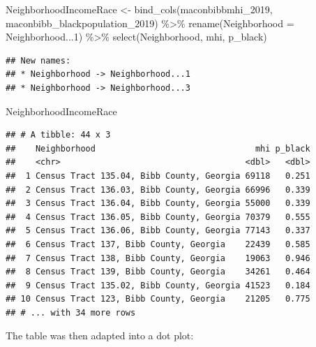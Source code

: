 \documentclass[
]{article}
\newenvironment{Shaded}{\begin{snugshade}}{\end{snugshade}}
\newcommand{\AttributeTok}[1]{\textcolor[rgb]{0.77,0.63,0.00}{#1}}
\newcommand{\DecValTok}[1]{\textcolor[rgb]{0.00,0.00,0.81}{#1}}
\newcommand{\FunctionTok}[1]{\textcolor[rgb]{0.00,0.00,0.00}{#1}}
\newcommand{\NormalTok}[1]{#1}
\newcommand{\OtherTok}[1]{\textcolor[rgb]{0.56,0.35,0.01}{#1}}
\newcommand{\SpecialCharTok}[1]{\textcolor[rgb]{0.00,0.00,0.00}{#1}}
\begin{document}
\begin{Shaded}
\begin{Highlighting}[]
\NormalTok{NeighborhoodIncomeRace }\OtherTok{\textless{}{-}} \FunctionTok{bind\_cols}\NormalTok{(maconbibbmhi\_2019, maconbibb\_blackpopulation\_2019) }\SpecialCharTok{\%\textgreater{}\%} 
 \FunctionTok{rename}\NormalTok{(}\AttributeTok{Neighborhood =}\NormalTok{ Neighborhood...}\DecValTok{1}\NormalTok{) }\SpecialCharTok{\%\textgreater{}\%}
 \FunctionTok{select}\NormalTok{(Neighborhood, mhi, p\_black) }
\end{Highlighting}
\end{Shaded}

\begin{verbatim}
## New names:
## * Neighborhood -> Neighborhood...1
## * Neighborhood -> Neighborhood...3
\end{verbatim}

\begin{Shaded}
\begin{Highlighting}[]
\NormalTok{NeighborhoodIncomeRace}
\end{Highlighting}
\end{Shaded}

\begin{verbatim}
## # A tibble: 44 x 3
##    Neighborhood                                mhi p_black
##    <chr>                                     <dbl>   <dbl>
##  1 Census Tract 135.04, Bibb County, Georgia 69118   0.251
##  2 Census Tract 136.03, Bibb County, Georgia 66996   0.339
##  3 Census Tract 136.04, Bibb County, Georgia 55000   0.339
##  4 Census Tract 136.05, Bibb County, Georgia 70379   0.555
##  5 Census Tract 136.06, Bibb County, Georgia 77143   0.337
##  6 Census Tract 137, Bibb County, Georgia    22439   0.585
##  7 Census Tract 138, Bibb County, Georgia    19063   0.946
##  8 Census Tract 139, Bibb County, Georgia    34261   0.464
##  9 Census Tract 135.02, Bibb County, Georgia 41523   0.184
## 10 Census Tract 123, Bibb County, Georgia    21205   0.775
## # ... with 34 more rows
\end{verbatim}

The table was then adapted into a dot plot:
\end{document}
